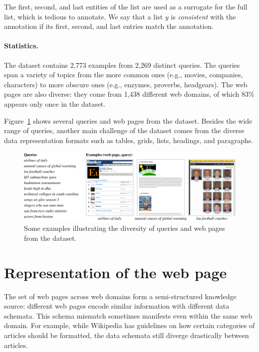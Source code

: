The first, second, and last entities of the list
are used as a surrogate for the full list,
which is tedious to annotate.
We say that a list $y$ is \emph{consistent}
with the annotation if its first, second, and last entries
match the annotation.

\paragraph{Statistics.}
The  dataset contains
2,773 examples from 2,269 distinct queries.
The queries span a variety of topics
from the more common ones
(e.g., movies, companies, characters)
to more obscure ones
(e.g., enzymes, proverbs, headgears).
The web pages are also diverse:
they come from 1,438 different web domains,
of which 83\% appears only once in the dataset.

Figure~\ref{fig:openweb-dataset} shows 
several queries and web pages from the dataset.
Besides the wide range of queries,
another main challenge of the dataset comes from
the diverse data representation formats such as 
tables, grids, lists, headings, and paragraphs.

\begin{figure}[t]
\centering
\includegraphics[width=\textwidth]{sfig/openweb.slides/extractionDataset.pdf}
\caption{Some examples illustrating the diversity of queries and web pages from the  dataset.}
\label{fig:openweb-dataset}
\end{figure}


\section{Representation of the web page}\label{sec:openweb-representation}
The set of web pages across web domains form
a semi-structured knowledge source:
different web pages encode similar information
with different data schemata.
This schema mismatch sometimes manifests
even within the same web domain.
For example, while Wikipedia has guidelines on how
certain categories of articles should be formatted,
the data schemata still diverge drastically
between articles.

